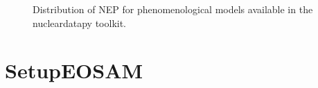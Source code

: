\documentclass[letterpaper,10pt,english]{sphinxmanual}
\begin{document}
\begin{figure}[htbp]
\centering
\capstart

\noindent{}
\caption{Distribution of NEP for phenomenological models available in the nucleardatapy toolkit.}\label{\detokenize{source/api/setup_eos_pheno:id9}}\end{figure}

\sphinxstepscope


\section{SetupEOSAM}
\label{\detokenize{source/api/setup_eos_am:setupeosam}}\label{\detokenize{source/api/setup_eos_am::doc}}\label{\detokenize{source/api/setup_eos_am:module-nucleardatapy.setup_eos_am}}
\end{document}
